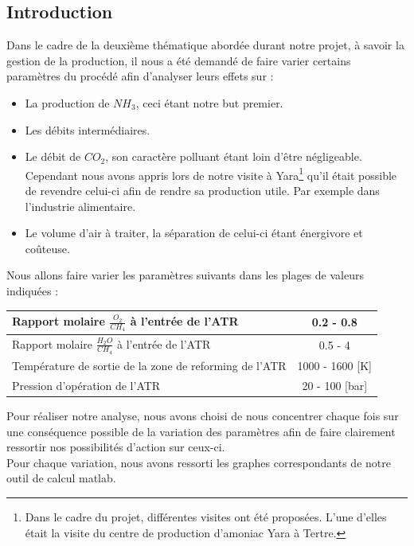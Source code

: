 \documentclass[12pt]{report}
\begin{document}
\renewcommand{\arraystretch}{1.5}

{\textcolor{carmine}{\chapter{Introduction}}}

Dans le cadre de la deuxième thématique abordée durant notre projet, à savoir la gestion de la production, il nous a été demandé de faire varier certains paramètres du procédé afin d'analyser leurs effets sur : \\
\begin{itemize}
\item La production de $NH_3$, ceci étant notre but premier.
\item Les débits intermédiaires.
\item Le débit de $CO_2$, son caractère polluant étant loin d'être négligeable. Cependant nous avons appris lors de notre visite à Yara\footnote{Dans le cadre du projet, différentes visites ont été proposées. L'une d'elles était la visite du centre de production d'amoniac Yara à Tertre.} qu'il était possible de revendre celui-ci afin de rendre sa production utile. Par exemple dans l'industrie alimentaire. 
\item Le volume d'air à traiter, la séparation de celui-ci étant énergivore et coûteuse.
\end{itemize}

Nous allons faire varier les paramètres suivants dans les plages de valeurs indiquées : \\


\begin{tabular}{|l|c|}
\hline
Rapport molaire $\frac{O_2}{CH_4}$ à l'entrée de l'ATR & 0.2 - 0.8 \\
\hline
Rapport molaire $\frac{H_2O}{CH_4}$ à l'entrée de l'ATR & 0.5 - 4 \\
\hline
Température de sortie de la zone de reforming de l'ATR & 1000 - 1600 [K]\\
\hline
Pression d'opération de l'ATR & 20 - 100 [bar] \\
\hline
\end{tabular}
\bigskip

Pour réaliser notre analyse, nous avons choisi de nous concentrer chaque fois sur une conséquence possible de la variation des paramètres afin de faire clairement ressortir nos possibilités d'action sur ceux-ci.\\
Pour chaque variation, nous avons ressorti les graphes correspondants de notre outil de calcul matlab.\\
\end{document}
